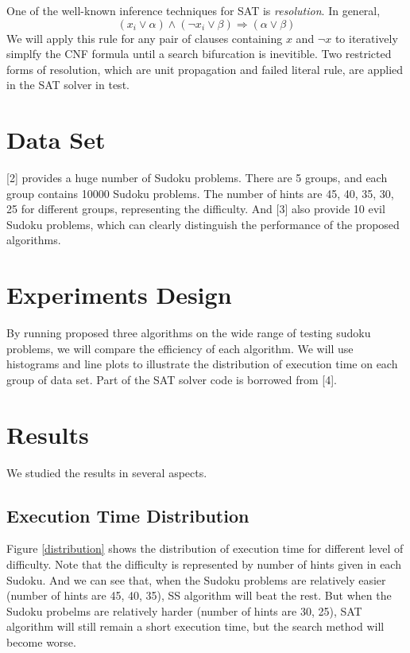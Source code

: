 \documentclass[11pt]{article}
\begin{document}
One of the well-known inference techniques for SAT is \textit{resolution}. In general, 
\begin{equation}
(x_i \vee \alpha) \wedge (\neg x_i \vee \beta) \Rightarrow (\alpha \vee \beta)
\end{equation}
We will apply this rule for any pair of clauses containing $x$ and $\neg x$ to iteratively simplfy the CNF formula until a search bifurcation is inevitible. Two restricted forms of resolution, which are unit propagation and failed literal rule, are applied in the SAT solver in test.

\section {Data Set}
[2] provides a huge number of Sudoku problems. There are 5 groups, and each group contains 10000 Sudoku problems. The number of hints are 45, 40, 35, 30, 25 for different groups, representing the difficulty. And [3] also provide 10 evil Sudoku problems, which can clearly distinguish the performance of the proposed algorithms.

\section {Experiments Design}
By running proposed three algorithms on the wide range of testing sudoku problems, we will compare the efficiency of each algorithm. We will use histograms and line plots to illustrate the distribution of execution time on each group of data set. Part of the SAT solver code is borrowed from [4].

\section {Results}
We studied the results in several aspects.
\subsection{Execution Time Distribution}
Figure \ref{distribution} shows the distribution of execution time for different level of difficulty. Note that the difficulty is represented by number of hints given in each Sudoku. And we can see that, when the Sudoku problems are relatively easier (number of hints are 45, 40, 35), SS algorithm will beat the rest. But when the Sudoku probelms are relatively harder (number of hints are 30, 25), SAT algorithm will still remain a short execution time, but the search method will become worse.
\end{document}
